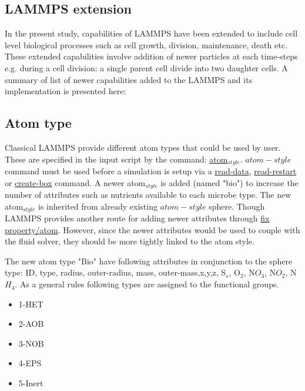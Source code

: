 \documentclass[11pt,a4paper,openright]{article}
\begin{document}
\subsection{LAMMPS extension}
In the present study, capabilities of LAMMPS have been extended to include cell level biological processes such as cell growth, division, maintenance, death etc. These extended capabilities involve addition of newer particles at each time-steps e.g. during a cell division: a single parent cell divide into two daughter cells. A summary of list of newer capabilities added to the LAMMPS and its implementation is presented here:


\subsection{Atom type}
Classical LAMMPS provide different atom types that could be used by user. These are specified in the input script by the command: \href{http://lammps.sandia.gov/doc/atom_style.html}{atom$_{style}$}. \href{http://lammps.sandia.gov/doc/atom_style.html}{$atom-style$} command must be used before a simulation is setup via a \href{http://lammps.sandia.gov/doc/read_data.html}{read-data}, \href{http://lammps.sandia.gov/doc/read_restart.html}{read-restart} or \href{http://lammps.sandia.gov/doc/create_box.html}{create-box} command. A newer atom$_{style}$ is added (named "bio") to increase the number of attributes such as nutrients available to each microbe type. The new atom$_{style}$ is inherited from already existing $atom-style$ sphere. Though LAMMPS provides another route for adding newer attributes through \href{http://lammps.sandia.gov/doc/fix_property_atom.html}{fix property/atom}. However, since the newer attributes would be used to couple with the fluid solver, they should be more tightly linked to the atom style. 

The new atom type "Bio" have following attributes in conjunction to the sphere type: ID, type, radius, outer-radius, mass, outer-mass,x,y,z, S$_s$, O$_2$, N$O_3$, N$O_2$, N$H_4$. As a general rules following types are assigned to the functional groups. 

\begin{itemize}
\item 1-HET 
\item 2-AOB
\item 3-NOB
\item 4-EPS
\item 5-Inert
\end{itemize} 
\end{document}
